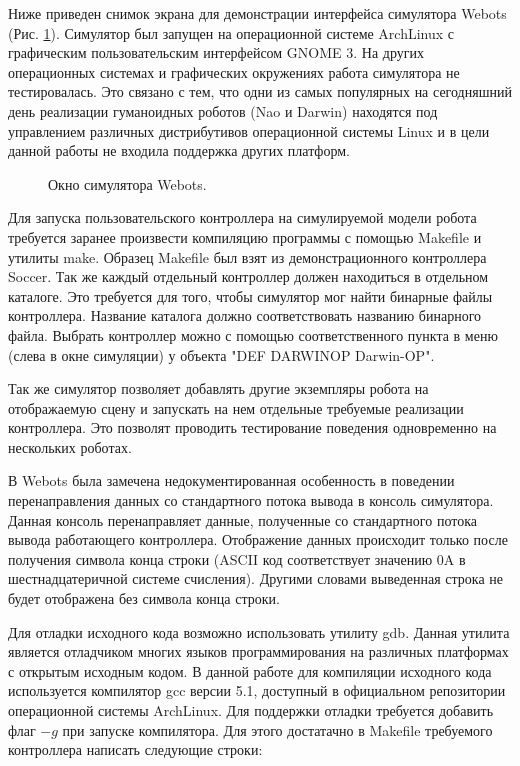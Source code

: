 Ниже приведен снимок экрана для демонстрации интерфейса симулятора Webots (Рис. \ref{im:1_webots_sample_window}). Симулятор был запущен на операционной системе ArchLinux с графическим пользовательским интерфейсом GNOME 3. На других операционных системах и графических окружениях работа симулятора не тестировалась. Это связано с тем, что одни из самых популярных на сегодняшний день реализации гуманоидных роботов (Nao и Darwin) находятся под управлением различных дистрибутивов операционной системы Linux и в цели данной работы не входила поддержка других платформ.

\begin{figure}[h]
\caption{Окно симулятора Webots.}
\label{im:1_webots_sample_window}
\end{figure}

Для запуска пользовательского контроллера на симулируемой модели робота требуется заранее произвести компиляцию программы с помощью Makefile и утилиты make. Образец Makefile был взят из демонстрационного контроллера Soccer. Так же каждый отдельный контроллер должен находиться в отдельном каталоге. Это требуется для того, чтобы симулятор мог найти бинарные файлы контроллера. Название каталога должно соответствовать названию бинарного файла. Выбрать контроллер можно с помощью соответственного пункта в меню (слева в окне симуляции) у объекта "DEF DARWINOP Darwin-OP".

Так же симулятор позволяет добавлять другие экземпляры робота на отображаемую сцену и запускать на нем отдельные требуемые реализации контроллера. Это позволят проводить тестирование поведения одновременно на нескольких роботах.

В Webots была замечена недокументированная особенность в поведении перенаправления данных со стандартного потока вывода в консоль симулятора. Данная консоль перенаправляет данные, полученные со стандартного потока вывода работающего контроллера. Отображение данных происходит только после получения символа конца строки (ASCII код соответствует значению 0A в шестнадцатеричной системе счисления). Другими словами выведенная строка не будет отображена без символа конца строки.

Для отладки исходного кода возможно использовать утилиту gdb. Данная утилита является отладчиком многих языков программирования на различных платформах с открытым исходным кодом. В данной работе для компиляции исходного кода используется компилятор gcc версии 5.1, доступный в официальном репозитории операционной системы ArchLinux. Для поддержки отладки требуется добавить флаг $-g$ при запуске компилятора.  Для этого достатачно в Makefile требуемого контроллера написать следующие строки:

